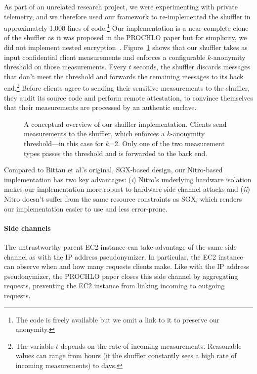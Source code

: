 As part of an unrelated research project, we were experimenting with private
telemetry, and we therefore used our framework to re-implemented the shuffler in
approximately 1,000 lines of code.\footnote{The code is freely available but we
omit a link to it to preserve our anonymity.}  Our implementation is a
near-complete clone of the shuffler as it was proposed in the PROCHLO paper but
for simplicity, we did not implement nested encryption~\cite[\S~3]{Bittau2017a}.
Figure~\ref{fig:shuffler} shows that our shuffler takes as input confidential
client measurements and enforces a configurable $k$-anonymity threshold on those
measurements.  Every $t$ seconds, the shuffler discards messages that don't meet
the threshold and forwards the remaining messages to its back end.\footnote{The
variable $t$ depends on the rate of incoming measurements.  Reasonable values
can range from hours (if the shuffler constantly sees a high rate of incoming
measurements) to days.} Before clients agree to sending their sensitive
measurements to the shuffler, they audit its source code and perform remote
attestation, to convince themselves that their measurements are processed by an
authentic enclave.

\begin{figure}[t]
\centering

\caption{A conceptual overview of our shuffler implementation.  Clients send
  measurements to the shuffler, which enforces a $k$-anonymity threshold---in
  this case for $k$=2. Only one of the two measurement types passes the
  threshold and is forwarded to the back end.}
\label{fig:shuffler}
\end{figure}

Compared to Bittau et al.'s original, SGX-based design, our Nitro-based
implementation has two key advantages: (\emph{i}) Nitro's underlying hardware
isolation makes our implementation more robust to hardware side channel attacks
and (\emph{ii}) Nitro doesn't suffer from the same resource constraints as SGX,
which renders our implementation easier to use and less error-prone.

\paragraph{Side channels}
The untrustworthy parent EC2 instance can take advantage of the same side
channel as with the IP address pseudonymizer.  In particular, the EC2 instance
can observe when and how many requests clients make.  Like with the IP address
pseudonymizer, the PROCHLO paper closes this side channel by aggregating
requests, preventing the EC2 instance from linking incoming to outgoing
requests.
